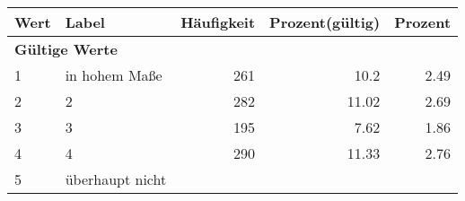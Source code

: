      \begin{longtable}{lXrrr}
     \toprule
     \textbf{Wert} & \textbf{Label} & \textbf{Häufigkeit} & \textbf{Prozent(gültig)} & \textbf{Prozent} \\
     \endhead
     \midrule
     \multicolumn{5}{l}{\textbf{Gültige Werte}}\\

     1 &
     \multicolumn{1}{X}{ in hohem Maße   } &


       \num{261} &
       \num[round-mode=places,round-precision=2]{10,2} &
         \num[round-mode=places,round-precision=2]{2,49} \\

     2 &
     \multicolumn{1}{X}{ 2   } &


       \num{282} &
       \num[round-mode=places,round-precision=2]{11,02} &
         \num[round-mode=places,round-precision=2]{2,69} \\

     3 &
     \multicolumn{1}{X}{ 3   } &


       \num{195} &
       \num[round-mode=places,round-precision=2]{7,62} &
         \num[round-mode=places,round-precision=2]{1,86} \\

     4 &
     \multicolumn{1}{X}{ 4   } &


       \num{290} &
       \num[round-mode=places,round-precision=2]{11,33} &
         \num[round-mode=places,round-precision=2]{2,76} \\

     5 &
     \multicolumn{1}{X}{ überhaupt nicht   } &



\end{longtable}
